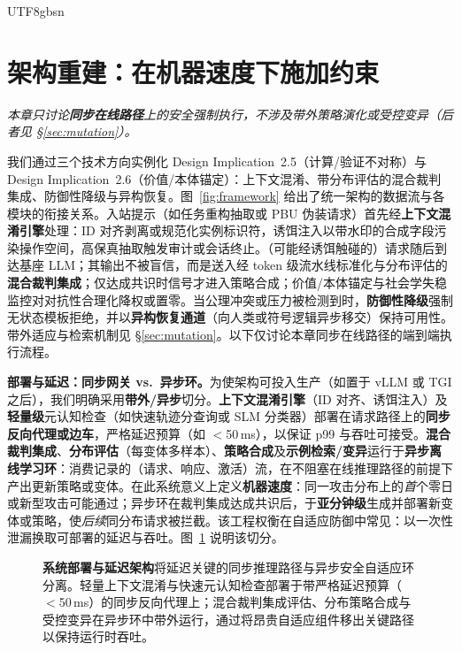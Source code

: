 \documentclass[letterpaper,twocolumn,10pt]{article}
\begin{document}
\begin{CJK}{UTF8}{gbsn}
\section{架构重建：在机器速度下施加约束}
\label{sec:reconstruction}

\noindent\textit{本章只讨论\textbf{同步在线路径}上的安全强制执行，不涉及带外策略演化或受控变异（后者见 \S\ref{sec:mutation}）。}

我们通过三个技术方向实例化 Design Implication~2.5（计算/验证不对称）与 Design Implication~2.6（价值/本体锚定）：上下文混淆、带分布评估的混合裁判集成、防御性降级与异构恢复。图~\ref{fig:framework} 给出了统一架构的数据流与各模块的衔接关系。入站提示（如任务重构抽取或 PBU 伪装请求）首先经\textbf{上下文混淆引擎}处理：ID 对齐剥离或规范化实例标识符，诱饵注入以带水印的合成字段污染操作空间，高保真抽取触发审计或会话终止。（可能经诱饵触碰的）请求随后到达基座 LLM；其输出不被盲信，而是送入经 token 级流水线标准化与分布评估的\textbf{混合裁判集成}；仅达成共识时信号才进入策略合成；价值/本体锚定与社会学失稳监控对对抗性合理化降权或置零。当公理冲突或压力被检测到时，\textbf{防御性降级}强制无状态模板拒绝，并以\textbf{异构恢复通道}（向人类或符号逻辑异步移交）保持可用性。带外适应与检索机制见 \S\ref{sec:mutation}。以下仅讨论本章同步在线路径的端到端执行流程。

\textbf{部署与延迟：同步网关 vs.\ 异步环。}为使架构可投入生产（如置于 vLLM 或 TGI 之后），我们明确采用\textbf{带外/异步}切分。\textbf{上下文混淆引擎}（ID 对齐、诱饵注入）及\textbf{轻量级}元认知检查（如快速轨迹分查询或 SLM 分类器）部署在请求路径上的\textbf{同步反向代理或边车}，严格延迟预算（如 $<$50\,ms），以保证 p99 与吞吐可接受。\textbf{混合裁判集成}、\textbf{分布评估}（每变体多样本）、\textbf{策略合成}及\textbf{示例检索/变异}运行于\textbf{异步离线学习环}：消费记录的（请求、响应、激活）流，在不阻塞在线推理路径的前提下产出更新策略或变体。在此系统意义上定义\textbf{机器速度}：同一攻击分布上的\emph{首}个零日或新型攻击可能通过；异步环在裁判集成达成共识后，于\textbf{亚分钟级}生成并部署新变体或策略，使\emph{后续}同分布请求被拦截。该工程权衡在自适应防御中常见：以一次性泄漏换取可部署的延迟与吞吐。图~\ref{fig:deployment} 说明该切分。

\begin{figure}[t]
\centering
{}
\caption{\textbf{系统部署与延迟架构}将延迟关键的同步推理路径与异步安全自适应环分离。轻量上下文混淆与快速元认知检查部署于带严格延迟预算（$<$50\,ms）的同步反向代理上；混合裁判集成评估、分布策略合成与受控变异在异步环中带外运行，通过将昂贵自适应组件移出关键路径以保持运行时吞吐。}
\label{fig:deployment}
\end{figure}


\end{CJK}
\end{document}
